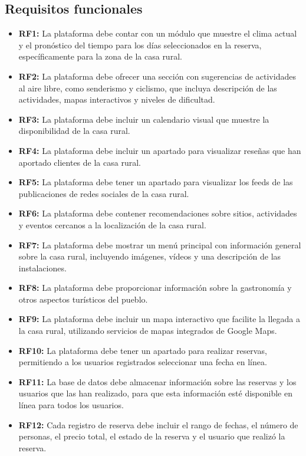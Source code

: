 \subsection{Requisitos funcionales}
\begin{itemize}

    \item \textbf{RF1:} La plataforma debe contar con un módulo que muestre el clima actual y el pronóstico del tiempo para los días seleccionados en la reserva, específicamente para la zona de la casa rural.
    \item \textbf{RF2:} La plataforma debe ofrecer una sección con sugerencias de actividades al aire libre, como senderismo y ciclismo, que incluya descripción de las actividades, mapas interactivos y niveles de dificultad.
    \item \textbf{RF3:} La plataforma debe incluir un calendario visual que muestre la disponibilidad de la casa rural.
    \item \textbf{RF4:} La plataforma debe incluir un apartado para visualizar reseñas que han aportado clientes de la casa rural.
    \item \textbf{RF5:} La plataforma debe tener un apartado para visualizar los feeds de las publicaciones de redes sociales de la casa rural.
    \item \textbf{RF6:} La plataforma debe contener recomendaciones sobre sitios, actividades y eventos cercanos a la localización de la casa rural.
    \item \textbf{RF7:} La plataforma debe mostrar un menú principal con información general sobre la casa rural, incluyendo imágenes, vídeos y una descripción de las instalaciones.
    \item \textbf{RF8:} La plataforma debe proporcionar información sobre la gastronomía y otros aspectos turísticos del pueblo.
    \item \textbf{RF9:} La plataforma debe incluir un mapa interactivo que facilite la llegada a la casa rural, utilizando servicios de mapas integrados de Google Maps.
    \item \textbf{RF10:} La plataforma debe tener un apartado para realizar reservas, permitiendo a los usuarios registrados seleccionar una fecha en línea.
    \item \textbf{RF11:} La base de datos debe almacenar información sobre las reservas y los usuarios que las han realizado, para que esta información esté disponible en línea para todos los usuarios.
    \item \textbf{RF12:} Cada registro de reserva debe incluir el rango de fechas, el número de personas, el precio total, el estado de la reserva y el usuario que realizó la reserva.

\end{itemize}

